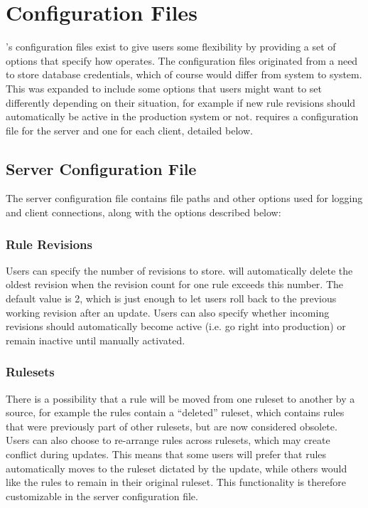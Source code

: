 \section{Configuration Files}
\label{sec:configuration_files}
\snowman{}'s configuration files exist to give users some flexibility by
providing a set of options that specify how \snowman{} operates. The
configuration files originated from a need to store database credentials, which
of course would differ from system to system. This was expanded to include some
options that users might want to set differently depending on their situation,
for example if new rule revisions should automatically be active in the
production system or not. \snowman{} requires a configuration file for the
server and one for each client, detailed below.

\subsection{Server Configuration File}
The server configuration file contains file paths and other options used for
logging and client connections, along with the options described below:

\subsubsection{Rule Revisions}
Users can specify the number of revisions to store. \snowman{} will
automatically delete the oldest revision when the revision count for one rule
exceeds this number. The default value is 2, which is just enough to let users
roll back to the previous working revision after an update. Users can also
specify whether incoming revisions should automatically become active (i.e. go
right into production) or remain inactive until manually activated.

\subsubsection{Rulesets}
There is a possibility that a rule will be moved from one ruleset to another by
a source, for example the \snort{} rules contain a ``deleted'' ruleset, which
contains rules that were previously part of other rulesets, but are now
considered obsolete. Users can also choose to re-arrange rules across rulesets,
which may create conflict during updates. This means that some users will prefer
that rules automatically moves to the ruleset dictated by the update, while
others would like the rules to remain in their original ruleset. This
functionality is therefore customizable in the server configuration file.

